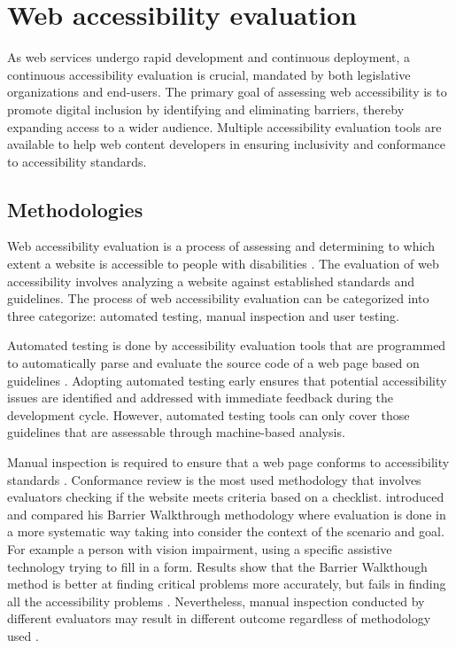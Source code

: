 \chapter{Web accessibility evaluation\label{accessibility_evaluation}}

As web services undergo rapid development and continuous deployment, a continuous accessibility evaluation is crucial, mandated by both legislative organizations and end-users. The primary goal of assessing web accessibility is to promote digital inclusion by identifying and eliminating barriers, thereby expanding access to a wider audience. Multiple accessibility evaluation tools are available to help web content developers in ensuring inclusivity and conformance to accessibility standards.

\section{Methodologies}

Web accessibility evaluation is a process of assessing and determining to which extent a website is accessible to people with disabilities \citep[Chapter~26.2]{webaccessibility}. The evaluation of web accessibility involves analyzing a website against established standards and guidelines. The process of web accessibility evaluation can be categorized into three categorize: automated testing, manual inspection and user testing.

Automated testing is done by accessibility evaluation tools that are programmed to automatically parse and evaluate the source code of a web page based on guidelines \citep[Chapter~26.2]{webaccessibility}. Adopting automated testing early ensures that potential accessibility issues are identified and addressed with immediate feedback during the development cycle. However, automated testing tools can only cover those guidelines that are assessable through machine-based analysis.

Manual inspection is required to ensure that a web page conforms to accessibility standards \citep[Chapter~26.2]{webaccessibility}. Conformance review is the most used methodology that involves evaluators checking if the website meets criteria based on a checklist. \textcite{comparative_accessibility_methods} introduced and compared his Barrier Walkthrough methodology where evaluation is done in a more systematic way taking into consider the context of the scenario and goal. For example a person with vision impairment, using a specific assistive technology trying to fill in a form. Results show that the Barrier Walkthough method is better at finding critical problems more accurately, but fails in finding all the accessibility problems \citep{comparative_accessibility_methods}. Nevertheless, manual inspection conducted by different evaluators may result in different outcome regardless of methodology used \citep{accessibility_evaluation_experts, 10.1145/1878803.1878813_testability_expertise}. 

